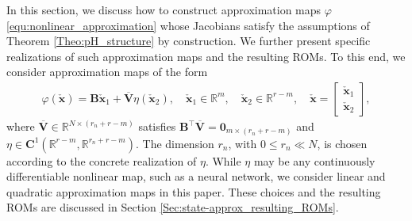 \documentclass{article}
\newcommand{\bmV}{\bm{V}}
\newcommand{\bmB}{\bm{B}}
\newcommand{\R}{\mathbb{R}}
\newcommand{\stateRed}{\check{\bm x}}
\newcommand{\portsize}{m}
\newcommand{\FOMsize}{N}
\newcommand{\ROMsize}{r}
\newcommand{\nlsize}{r_n}
\newcommand{\Vbar}{\overline{\bmV}}
\newcommand{\approxfunc}{\varphi}
\newcommand{\decfunc}{\eta}
\newcommand{\ConFuncSet}{\bm{C}}
\newcommand{\ROMs}{\textsf{ROM}s\xspace}
\begin{document}
In this section, we discuss how to construct approximation maps $\approxfunc$ \eqref{equ:nonlinear_approximation} whose Jacobians satisfy the assumptions of Theorem \ref{Theo:pH_structure} by construction. We further present specific realizations of such approximation maps and the resulting \ROMs. To this end, we consider approximation maps of the form 
\begin{align}
\label{equ:general_embedding_map}
									\approxfunc(\stateRed) =\bmB \stateRed_1 + \Vbar \decfunc\left(\stateRed_2\right), \quad	\stateRed_1\in\R^{\portsize}, \quad 	\stateRed_2\in\R^{\ROMsize-\portsize}, \quad	\stateRed=\begin{bmatrix}\stateRed_1 \\ \stateRed_2\end{bmatrix},
\end{align}
where $\Vbar\in\R^{\FOMsize\times (\nlsize+\ROMsize-\portsize)}$ satisfies $\bmB^{\top} \Vbar= \bm{0}_{m \times (\nlsize+\ROMsize-\portsize)}$ and $\decfunc\in\ConFuncSet^1(\R^{\ROMsize-\portsize}, \R^{\nlsize+\ROMsize-\portsize})$. The dimension $r_n$, with $0\leq r_n \ll N$, is chosen according to the concrete realization of $\eta$. While $\eta$ may be any continuously differentiable nonlinear map, such as a neural network, we consider linear and quadratic approximation maps in this paper. These choices and the resulting \ROMs are discussed in Section \ref{Sec:state-approx_resulting_ROMs}. 
								
\end{document}
